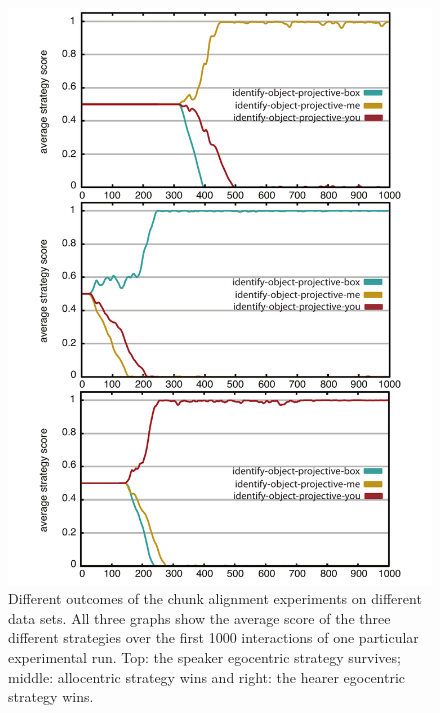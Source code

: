 \begin{figure}
\begin{centering}
\includegraphics[width=0.95\columnwidth]{figs/chunk-alignment-formation-projective-space-game-4-together}
\caption[Different outcomes of chunk alignment experiments]{%
Different outcomes of the chunk alignment experiments on 
different data sets. All three graphs show the average score of the three different 
strategies over the first 1000 interactions of one particular experimental run. 
Top: the speaker egocentric strategy survives; middle: allocentric strategy 
wins and right: the hearer egocentric strategy wins.}
\label{f:chunk-alignment-different-outcomes}
\end{centering}
\end{figure}


